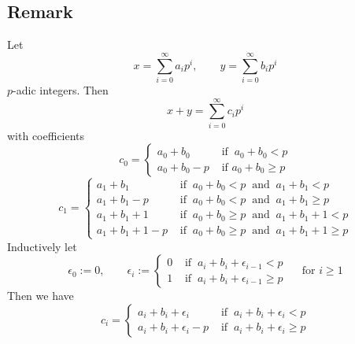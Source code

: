 \documentclass[12pt]{book}
\begin{document}
\begin{spacing}{1.3}
\subsection{Remark}%
Let
$$x= \sum_{i=0}^{\infty} a_i p^{i}, \qquad y=\sum_{i=0}^{\infty} b_i p^{i}$$
$p$-adic integers. Then 
$$x+y = \sum_{i=0}^{\infty} c_i p^{i}$$
with coefficients
$$c_0=\begin{cases} a_0+b_0 & \textrm{ if }\ a_0+b_0 <p \\ a_0+b_0-p & \textrm{ if } a_0+b_0 \geqslant p\end{cases}$$
$$c_1=\begin{cases} a_1+b_1 & \textrm{ if }\ a_0+b_0 <p \ \textrm{ and } \ a_1+b_1 < p \\
a_1+b_1-p & \textrm{ if } \ a_0+b_0<p \ \textrm{ and } \ a_1+b_1 \geqslant p \\
a_1+b_1+1 & \textrm{ if } \ a_0+b_0 \geqslant p \ \textrm{ and } \ a_1+b_1 +1 <p \\
a_1+b_1+1-p & \textrm{ if } \ a_0+b_0 \geqslant p \ \textrm{ and } \ a_1+b_1+1 \geqslant p \end{cases}$$
Inductively let 
$$\epsilon_0:=0,\qquad \epsilon_i:= \begin{cases} 0 & \textrm{ if } \ a_i+b_i + \epsilon_{i-1} < p \\ 1 & \textrm{ if } \ a_i + b_i + \epsilon_{i-1}\geqslant p \end{cases} \quad \textrm{ for } i \geqslant 1$$ 
Then we have
$$c_i=\begin{cases} a_i+b_i+\epsilon_i & \textrm{ if } \ a_i + b_i + \epsilon_i < p \\ a_i + b_i + \epsilon_i - p & \textrm{ if } \ a_i+b_i+\epsilon_i \geqslant p \end{cases}$$



\end{spacing}
\end{document}
